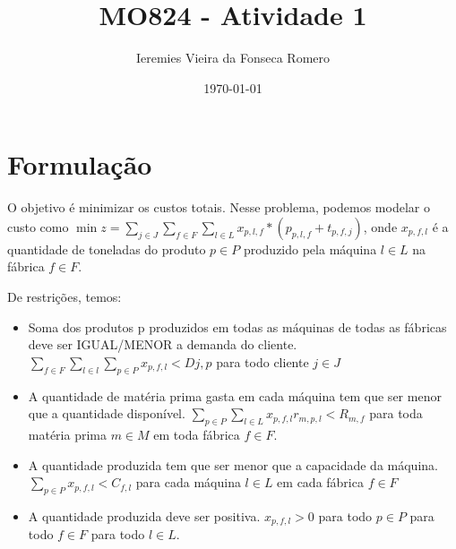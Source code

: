\documentclass[11pt]{article}
\author{Ieremies Vieira da Fonseca Romero}
\date{\today}
\title{MO824 - Atividade 1}
\theoremstyle{definition}
\theoremstyle{definition}
\theoremstyle{remark}
\theoremstyle{remark}
\theoremstyle{remark}
\theoremstyle{remark}
\theoremstyle{definition}
\begin{document}
\maketitle
\tableofcontents


\section{Formulação}
\label{sec:orgc279aa8}
O objetivo é minimizar os custos totais. Nesse problema, podemos modelar o custo como \(\min z = \sum \limits_{j \in J} \sum \limits_{f \in F} \sum \limits_{l \in L} x_{p,l, f} * (p_{p,l,f} + t_{p,f,j})\), onde \(x_{p,f,l}\) é a quantidade de toneladas do produto \(p \in P\) produzido pela máquina \(l \in L\) na fábrica \(f \in F\).

De restrições, temos:
\begin{itemize}
\item Soma dos produtos p produzidos em todas as máquinas de todas as fábricas deve ser IGUAL/MENOR a demanda do cliente. \(\sum_{f \in F} \sum_{l \in l} \sum_{p \in P} x_{p,f,l} < D{j,p}\) para todo cliente \(j \in J\)
\item A quantidade de matéria prima gasta em cada máquina tem que ser menor que a quantidade disponível. \(\sum_{p \in P} \sum_{l \in L} x_{p,f,l} r_{m,p,l} < R_{m,f}\) para toda matéria prima \(m \in M\) em toda fábrica \(f \in F\).
\item A quantidade produzida tem que ser menor que a capacidade da máquina.
\(\sum_{p \in P} x_{p,f,l} < C_{f,l}\) para cada máquina \(l \in L\) em cada fábrica \(f \in F\)
\item A quantidade produzida deve ser positiva. \(x_{p,f,l} > 0\) para todo \(p \in P\) para todo \(f \in F\) para todo \(l \in L\).
\end{itemize}
\end{document}
